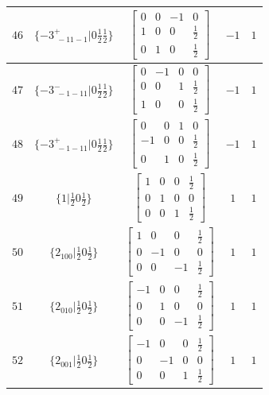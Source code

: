 \documentclass[fleqn,8pt]{jsarticle}
\begin{document}
\begin{longtable}{ccccc}
$ 46 $ & $ \{-3^{+}_{\,\,-11-1}|0 \frac{1}{2} \frac{1}{2}\} $ & $ \begin{bmatrix} 0 & 0 & -1 & 0 \\ 1 & 0 & 0 & \frac{1}{2} \\ 0 & 1 & 0 & \frac{1}{2} \end{bmatrix} $ & $ -1 $ & $ 1 $ \\ \hline
$ 47 $ & $ \{-3^{-}_{\,\,-1-11}|0 \frac{1}{2} \frac{1}{2}\} $ & $ \begin{bmatrix} 0 & -1 & 0 & 0 \\ 0 & 0 & 1 & \frac{1}{2} \\ 1 & 0 & 0 & \frac{1}{2} \end{bmatrix} $ & $ -1 $ & $ 1 $ \\ \hline
$ 48 $ & $ \{-3^{+}_{\,\,-1-11}|0 \frac{1}{2} \frac{1}{2}\} $ & $ \begin{bmatrix} 0 & 0 & 1 & 0 \\ -1 & 0 & 0 & \frac{1}{2} \\ 0 & 1 & 0 & \frac{1}{2} \end{bmatrix} $ & $ -1 $ & $ 1 $ \\ \hline
$ 49 $ & $ \{1|\frac{1}{2} 0 \frac{1}{2}\} $ & $ \begin{bmatrix} 1 & 0 & 0 & \frac{1}{2} \\ 0 & 1 & 0 & 0 \\ 0 & 0 & 1 & \frac{1}{2} \end{bmatrix} $ & $ 1 $ & $ 1 $ \\ \hline
$ 50 $ & $ \{2{}_{100}|\frac{1}{2} 0 \frac{1}{2}\} $ & $ \begin{bmatrix} 1 & 0 & 0 & \frac{1}{2} \\ 0 & -1 & 0 & 0 \\ 0 & 0 & -1 & \frac{1}{2} \end{bmatrix} $ & $ 1 $ & $ 1 $ \\ \hline
$ 51 $ & $ \{2{}_{010}|\frac{1}{2} 0 \frac{1}{2}\} $ & $ \begin{bmatrix} -1 & 0 & 0 & \frac{1}{2} \\ 0 & 1 & 0 & 0 \\ 0 & 0 & -1 & \frac{1}{2} \end{bmatrix} $ & $ 1 $ & $ 1 $ \\ \hline
$ 52 $ & $ \{2{}_{001}|\frac{1}{2} 0 \frac{1}{2}\} $ & $ \begin{bmatrix} -1 & 0 & 0 & \frac{1}{2} \\ 0 & -1 & 0 & 0 \\ 0 & 0 & 1 & \frac{1}{2} \end{bmatrix} $ & $ 1 $ & $ 1 $ \\ \hline

\end{longtable}
\end{document}
